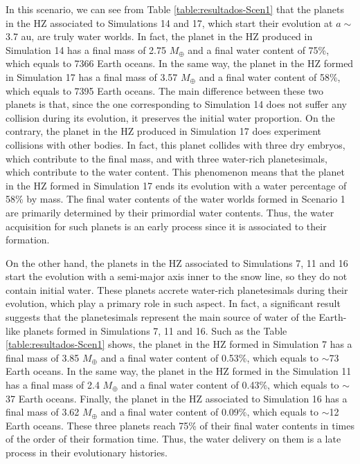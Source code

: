 \documentclass{aa}
\begin{document}
In this scenario, we can see from Table \ref{table:resultados-Scen1} that the planets in the HZ associated to Simulations 14 and 17,
which start their evolution at $a \sim$ 3.7 au, are truly water worlds. In fact, the planet in the HZ produced in Simulation 14
has a final mass of 2.75 $M_{\oplus}$ and a final water content of 75\%, which equals to 7366 Earth oceans. In the same way,
the planet in the HZ formed in Simulation 17 has a final mass of 3.57 $M_{\oplus}$ and a final water content of 58\%, which equals
to 7395 Earth oceans. The main difference between these two planets is that, since the one corresponding
to Simulation 14 does not suffer any collision during its evolution, it preserves the initial water proportion. On the contrary, the
planet in the HZ produced in Simulation 17 does experiment collisions with other bodies. In fact, this planet collides with three
dry embryos, which contribute to the final mass, and with three water-rich planetesimals, which contribute to the water content.
This phenomenon means that the planet in the HZ formed in Simulation 17 ends its evolution with a water percentage of 58\%
by mass. The final water contents of the water worlds formed in Scenario 1 are primarily determined
by their primordial water contents. Thus, the water acquisition for such planets is an early process since it is associated
to their formation.

On the other hand, the planets in the HZ associated to Simulations 7, 11 and 16 start the evolution with a semi-major axis inner
to the snow line, so they do not contain initial water. These planets accrete water-rich planetesimals
during their evolution, which play a primary role in such aspect. In fact, a significant result suggests that the planetesimals
represent the main source of water of the Earth-like planets formed in Simulations 7, 11 and 16. Such as the
Table \ref{table:resultados-Scen1} shows, the planet in the HZ formed in Simulation 7 has a final mass of 3.85 $M_{\oplus}$ and
a final water content of 0.53\%, which equals to $\sim$73 Earth oceans. In the same way, the planet in the HZ formed in the
Simulation 11 has a final mass of 2.4 $M_{\oplus}$ and a final water content of 0.43\%, which equals to $\sim$37 Earth oceans.
Finally, the planet in the HZ associated to Simulation 16 has a final mass of 3.62 $M_{\oplus}$ and
a final water content of 0.09\%, which equals to $\sim$12 Earth oceans. These three planets reach
75\% of their final water contents in times of the order of their formation time. Thus, the water delivery on them is
a late process in their evolutionary histories.
\end{document}
